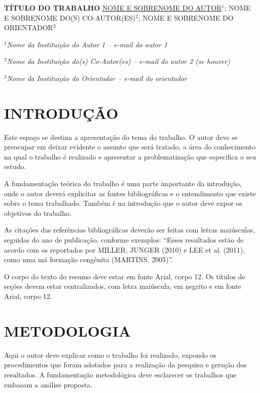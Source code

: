 \documentclass[12pt, a4paper]{article}
\begin{document}
	\begin{center}
		\textbf{\uppercase{TÍTULO DO TRABALHO}}
		\vskip 12pt
		\underline{\uppercase{NOME E SOBRENOME DO AUTOR}$^1$}; \uppercase{NOME E SOBRENOME DO(S) 
		CO-AUTOR(ES)}$^2$; \uppercase{NOME E SOBRENOME DO ORIENTADOR}$^3$
		\vskip 12pt
		\begin{footnotesize}
			\textit{
				$^1$Nome da Instituição do Autor 1 – e-mail do autor 1
			}
		
			\textit{
				$^2$Nome da Instituição do(s) Co-Autor(es) – e-mail do autor 2 
				(se houver)
			}
		
			\textit{
				$^3$Nome da Instituição do Orientador – e-mail do orientador
			}
		
		\end{footnotesize}
		
	\end{center}
	\vskip 12pt
	
	\section{INTRODUÇÃO}
	Este espaço se destina a apresentação do tema do trabalho. O autor deve se 
	preocupar em deixar evidente o assunto que será tratado, a área do 
	conhecimento na qual o trabalho é realizado e apresentar a problematização 
	que especifica o seu estudo. 

	A fundamentação teórica do trabalho é uma parte importante da introdução, 
	onde o autor deverá explicitar as fontes bibliográficas e o entendimento 
	que existe sobre o tema trabalhado. Também é na introdução que o autor deve 
	expor os objetivos do trabalho.
	
	As citações das referências bibliográficas deverão ser feitas com letras 
	maiúsculas, seguidas do ano de publicação, conforme exemplos: “Esses 
	resultados estão de acordo com os reportados por MILLER; JUNGER (2010) e 
	LEE et al. (2011), como uma má formação congênita (MARTINS, 2005)”.	
	
	O corpo do texto do resumo deve estar em fonte Arial, corpo 12. Os títulos 
	de seções devem estar centralizados, com letra maiúscula, em negrito e em 
	fonte Arial, corpo 12.
	
	\section{METODOLOGIA}
	Aqui o autor deve explicar como o trabalho foi realizado, expondo os 	
	procedimentos que foram adotados para a realização da pesquisa e geração 
	dos resultados. A fundamentação metodológica deve esclarecer os trabalhos 
	que embasam a análise proposta.
	
\end{document}

